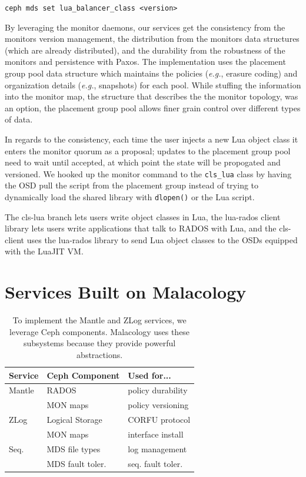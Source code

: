 \documentclass[10pt,twocolumn]{article}
\begin{document}
\noindent \texttt{ceph\ mds\ set\ lua\_balancer\_class\ \textless{}version\textgreater{}}

By leveraging the monitor daemons, our services get the consistency from
the monitors version management, the distribution from the monitors data
structures (which are already distributed), and the durability from the
robustness of the monitors and persistence with Paxos. The
implementation uses the placement group pool data structure which
maintains the policies (\emph{e.g.}, erasure coding) and organization
details (\emph{e.g.}, snapshots) for each pool. While stuffing the
information into the monitor map, the structure that describes the the
monitor topology, was an option, the placement group pool allows finer
grain control over different types of data.

In regards to the consistency, each time the user injects a new Lua
object class it enters the monitor quorum as a proposal; updates to the
placement group pool need to wait until accepted, at which point the
state will be propogated and versioned. We hooked up the monitor command
to the \texttt{cls\_lua} class by having the OSD pull the script from
the placement group instead of trying to dynamically load the shared
library with \texttt{dlopen()} or the Lua script.

The cls-lua branch lets users write object classes in Lua, the lua-rados
client library lets users write applications that talk to RADOS with
Lua, and the cls-client uses the lua-rados library to send Lua object
classes to the OSDs equipped with the LuaJIT VM.
\fi

\section{Services Built on Malacology}\label{services-built-on-malacology}

\label{services}

\begin{table}
\centering
\begin{tabular}{  l | l | l    }
\textbf{Service} & \textbf{Ceph Component} & \textbf{Used for...}  \\ \hline
Mantle  & RADOS    & policy durability \\
        & MON maps & policy versioning \\ \hline
ZLog    & Logical Storage & CORFU protocol  \\ 
        & MON maps & interface install \\ \hline
Seq.    & MDS file types & log management \\ 
        & MDS fault toler. & seq. fault toler. \\
\end{tabular}
\caption{To implement the Mantle and ZLog services, we leverage Ceph components. Malacology uses these subsystems because they provide powerful abstractions.}
\label{table:implementation}
\end{table}
\end{document}
